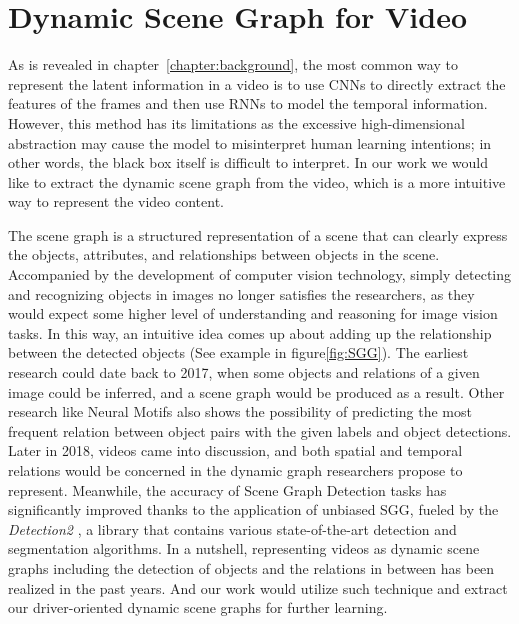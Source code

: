 \section{Dynamic Scene Graph for Video}

As is revealed in chapter~\ref{chapter:background}, the most common way to represent the latent information in a video is to use CNNs to directly extract the features of the frames and then use RNNs to model the temporal information. However, this method has its limitations as the excessive high-dimensional abstraction may cause the model to misinterpret human learning intentions; in other words, the black box itself is difficult to interpret. In our work we would like to extract the dynamic scene graph from the video, which is a more intuitive way to represent the video content.

The scene graph is a structured representation of a scene that can clearly express the objects, attributes, and relationships between objects in the scene\cite{9661322}. Accompanied by the development of computer vision technology, simply detecting and recognizing objects in images no longer satisfies the researchers, as they would expect some higher level of understanding and reasoning for image vision tasks. In this way, an intuitive idea comes up about adding up the relationship between the detected objects (See example in figure\ref{fig:SGG}). The earliest research could date back to 2017, when some objects and relations of a given image could be inferred, and a scene graph would be produced as a result\cite{xu2017scene}. Other research like Neural Motifs\cite{zellers2018neural} also shows the possibility of predicting the most frequent relation between object pairs with the given labels and object detections. Later in 2018, videos came into discussion, and both spatial and temporal relations would be concerned in the dynamic graph researchers propose to represent\cite{wang2018videos}. Meanwhile, the accuracy of Scene Graph Detection tasks has significantly improved thanks to the application of unbiased SGG\cite{wang2018videos}, fueled by the \textit{Detection2} \cite{wu2019detectron2}, a library that contains various state-of-the-art detection and segmentation algorithms. In a nutshell, representing videos as dynamic scene graphs including the detection of objects and the relations in between has been realized in the past years. And our work would utilize such technique and extract our driver-oriented dynamic scene graphs for further learning.

